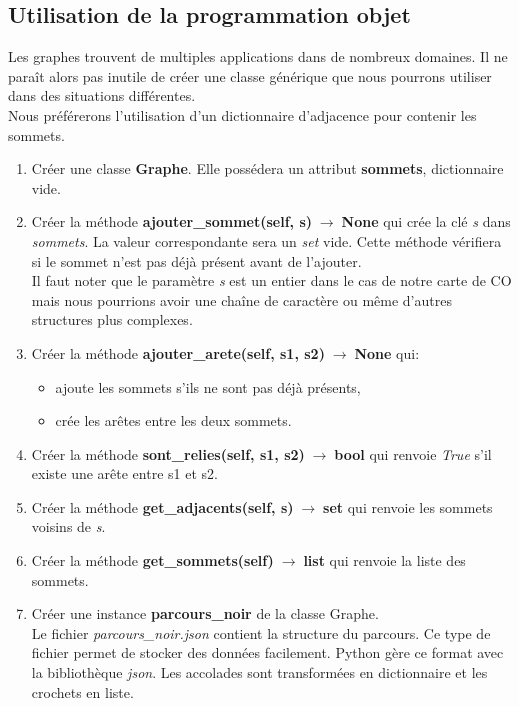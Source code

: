 \documentclass[a4paper,11pt]{article}
\begin{document}
\begin{Form}
\section{Utilisation de la programmation objet}
Les graphes trouvent de multiples applications dans de nombreux domaines. Il ne paraît alors pas inutile de créer une classe générique que nous pourrons utiliser dans des situations différentes.\\
Nous préférerons l'utilisation d'un dictionnaire d'adjacence pour contenir les sommets.
\begin{activite}
\begin{enumerate}
\item Créer une classe \textbf{Graphe}. Elle possédera un attribut \textbf{sommets}, dictionnaire vide.
\item Créer la méthode \textbf{ajouter\_sommet(self, s)$\;\rightarrow\;$None} qui crée la clé \emph{s} dans \emph{sommets}. La valeur correspondante sera un \emph{set} vide. Cette méthode vérifiera si le sommet n'est pas déjà présent avant de l'ajouter.\\Il faut noter que le paramètre \emph{s} est un entier dans le cas de notre carte de CO mais nous pourrions avoir une chaîne de caractère ou même d'autres structures plus complexes.
\item Créer la méthode \textbf{ajouter\_arete(self, s1, s2)$\;\rightarrow\;$None} qui:
\begin{itemize}
\item ajoute les sommets s'ils ne sont pas déjà présents,
\item crée les arêtes entre les deux sommets.
\end{itemize}
\item Créer la méthode \textbf{sont\_relies(self, s1, s2)$\;\rightarrow\;$bool} qui renvoie \emph{True} s'il existe une arête entre s1 et s2.
\item Créer la méthode \textbf{get\_adjacents(self, s)$\;\rightarrow\;$set} qui renvoie les sommets voisins de \emph{s}.
\item Créer la méthode \textbf{get\_sommets(self)$\;\rightarrow\;$list} qui renvoie la liste des sommets.
\item Créer une instance \textbf{parcours\_noir} de la classe Graphe.\\
Le fichier \emph{parcours\_noir.json} contient la structure du parcours. Ce type de fichier permet de stocker des données facilement. Python gère ce format avec la bibliothèque \emph{json}. Les accolades sont transformées en dictionnaire et les crochets en liste.

\end{enumerate}
\end{activite}
\end{Form}
\end{document}
